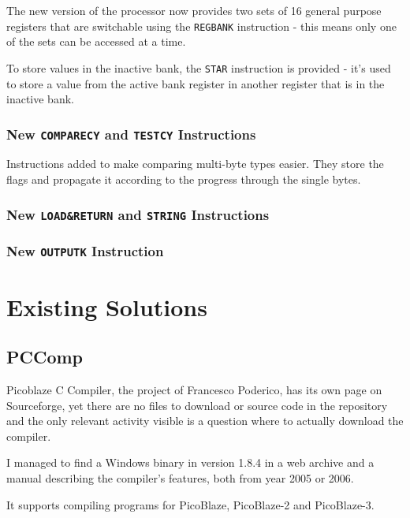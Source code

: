         The new version of the processor now provides two sets of 16 general purpose registers that are switchable using the \texttt{REGBANK} instruction - this means only one of the sets can be accessed at a time.

        To store values in the inactive bank, the \texttt{STAR} instruction is provided - it's used to store a value from the active bank register in another register that is in the inactive bank.

        \subsection{New \texttt{COMPARECY} and \texttt{TESTCY} Instructions}

        Instructions added to make comparing multi-byte types easier. They store the flags and propagate it according to the progress through the single bytes.

        \subsection{New \texttt{LOAD\&RETURN} and \texttt{STRING} Instructions}

        

        \subsection{New \texttt{OUTPUTK} Instruction}



\chapter{Existing Solutions}\label{existing}

    \section{PCComp}\label{pccomp}

    Picoblaze C Compiler, the project of Francesco Poderico, has its own page on Sourceforge, %
    yet there are no files to download or source code in the repository and the only relevant activity visible is a question where to actually download the compiler.

    I managed to find a Windows binary in version 1.8.4 in a web archive and a manual describing the compiler's features, both from year 2005 or 2006.

    It supports compiling programs for PicoBlaze, PicoBlaze-2 and PicoBlaze-3.


